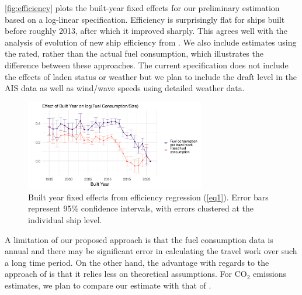 \documentclass[hidelinks, 12pt,letterpaper]{article}
\begin{document}
 \autoref{fig:efficiency} plots the built-year fixed effects for our preliminary estimation based on a log-linear specification. Efficiency is surprisingly flat for ships built before roughly 2013, after which it improved sharply. This agrees well with the analysis of evolution of new ship efficiency from \citet[][Figure 15]{faber2015historical}. We also include estimates using the rated, rather than the actual fuel consumption, which illustrates the difference between these approaches. The current specification does not include the effects of laden status or weather but we plan to include the draft level in the AIS data as well as wind/wave speeds using detailed weather data. %

\begin{figure}[h]
  \centering

  \includegraphics[width = 0.7\textwidth]{Efficiency_Regression_Size_Built_coefs_1and3_ggplot.png}
  \caption{Built year fixed effects from efficiency regression (\ref{eq1}). Error bars represent 95\% confidence intervals, with errors clustered at the individual ship level.}
  \label{fig:efficiency}
\end{figure} 

A limitation of our proposed approach is that the fuel consumption data is annual and there may be significant error in calculating the travel work over such a long time period. On the other hand, the advantage with regards to the approach of \citet{faber2020fourth} is that it relies less on theoretical assumptions. For CO$_2$ emissions estimates, we plan to compare our estimate with that of \citet{faber2020fourth}. %
\end{document}
